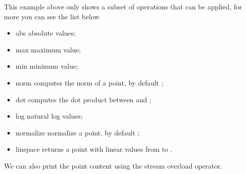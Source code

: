 \documentclass[letterpaper,10pt,english]{sphinxmanual}
\begin{document}
\sphinxAtStartPar
This example above only shows a subset of operations that can be applied, for more you can see the list below.
\begin{itemize}
\item {} 
\sphinxAtStartPar
abs  \sphinxhyphen{} absolute values;

\item {} 
\sphinxAtStartPar
max  \sphinxhyphen{} maximum value;

\item {} 
\sphinxAtStartPar
min  \sphinxhyphen{} minimum value;

\item {} 
\sphinxAtStartPar
norm  \sphinxhyphen{} computes the norm of a point, by default ;

\item {} 
\sphinxAtStartPar
dot  \sphinxhyphen{} computes the dot product between  and ;

\item {} 
\sphinxAtStartPar
log  \sphinxhyphen{} natural log values;

\item {} 
\sphinxAtStartPar
normalize  \sphinxhyphen{} normalize a point, by default ;

\item {} 
\sphinxAtStartPar
linspace  \sphinxhyphen{} returns a point with  linear values from  to .

\end{itemize}

\sphinxAtStartPar
We can also print the point content using the stream overload operator.

\begin{sphinxVerbatim}[commandchars=\\\{\}]
    
\end{sphinxVerbatim}
\end{document}
